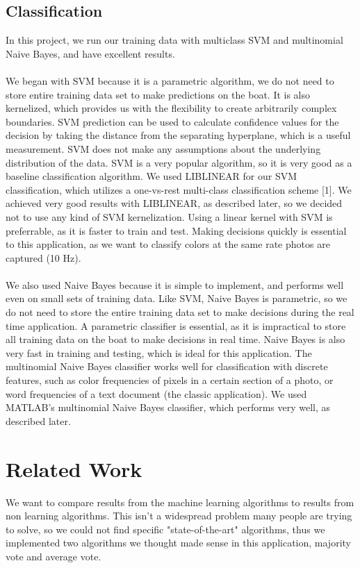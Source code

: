 \documentclass{article} %
\begin{document}
\subsection{Classification}
In this project, we run our training data with multiclass SVM and multinomial Naive Bayes, and have excellent results. \\\\ %
We began with SVM because it is a parametric algorithm, we do not need to store entire 
training data set to make predictions on the boat. It is also kernelized, which provides us with the flexibility to
create arbitrarily complex boundaries. SVM prediction can be used to calculate confidence values for the
decision by taking the distance from the separating hyperplane, which is a useful measurement. SVM does not make any assumptions about the underlying distribution of the data. SVM is a very popular algorithm, so it is very good as a baseline classification algorithm. We used LIBLINEAR for our SVM classification, which utilizes a one-vs-rest multi-class classification scheme [1]. We achieved very good results with LIBLINEAR, as described later, so we decided not to use any kind of SVM kernelization. Using a linear kernel with SVM is preferrable, as it is faster to train and test. Making decisions quickly is essential to this application, as we want to classify colors at the same rate photos are captured (10 Hz).\\\\
We also used Naive Bayes because it is simple to implement, and performs well even on small sets of training data. Like SVM, Naive Bayes is parametric, so we do not need to store the entire training data set to make decisions during the real time application. A parametric classifier is essential, as it is impractical to store all training data on the boat to make decisions in real time. Naive Bayes is also very fast in training and testing, which is ideal for this application. The multinomial Naive Bayes classifier works well for classification with discrete features, such as color frequencies of pixels in a certain section of a photo, or word frequencies of a text document (the classic application). We used MATLAB's multinomial Naive Bayes classifier, which performs very well, as described later.

\section{Related Work}
We want to compare results from the machine learning algorithms to results from non learning algorithms. This isn't a widespread problem many people are trying to solve, so we could not find specific "state-of-the-art" algorithms, thus we implemented two algorithms we thought made sense in this application, majority vote and average vote.
\end{document}
